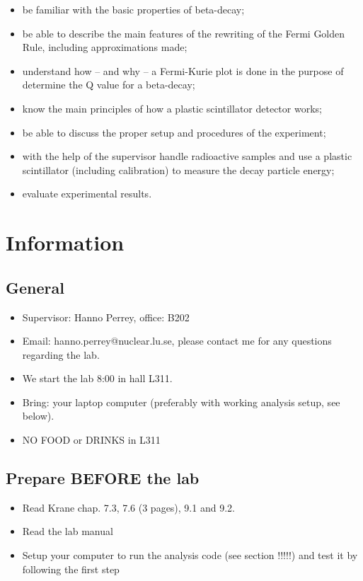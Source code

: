 \documentclass[a4,11pt, notitlepage]{article}
\begin{document}
\begin{itemize}
\item be familiar with the basic properties of beta-decay;
\item be able to describe the main features of the rewriting of the
  Fermi Golden Rule, including approximations made;
\item understand how -- and why -- a Fermi-Kurie plot is done in the purpose
  of determine the Q value for a beta-decay;
\item know the main principles of how a plastic scintillator detector works;
\item be able to discuss the proper setup and procedures of the experiment;
\item with the help of the supervisor handle radioactive samples and use a
  plastic scintillator (including calibration) to measure the decay particle energy;
\item evaluate experimental results.
\end{itemize}

\pagebreak
\section{Information}


\subsection{General}

\begin{itemize}
\item Supervisor: Hanno Perrey, office: B202
\item Email: hanno.perrey@nuclear.lu.se, please contact me for any questions regarding the lab. 
\item We start the lab 8:00 in hall L311. 
\item Bring: your laptop computer (preferably with working
  analysis setup, see below). 
\item NO FOOD or DRINKS in L311
\end{itemize}



\subsection{Prepare BEFORE the lab}

\begin{itemize}
\item Read Krane chap. 7.3, 7.6 (3 pages), 9.1 and 9.2. 
\item Read the lab manual
\item Setup your computer to run the analysis code (see section !!!!!)
  and test it by following the first step
\end{itemize}
\end{document}
